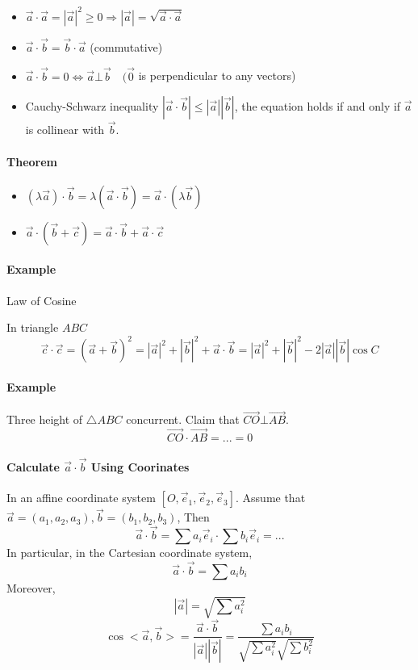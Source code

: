 \documentclass[UTF8]{ctexart}
\begin{document}
\begin{itemize}
  \item $\vec a \cdot \vec a  = |\vec a |^2 \geq 0 \Rightarrow |\vec a| = \sqrt{\vec a \cdot \vec a}$
  \item $\vec a \cdot \vec b  = \vec b \cdot \vec a$ (commutative)
  \item $\vec a \cdot \vec b = 0 \iff \vec a \bot \vec b \quad (\vec 0$ is perpendicular to any vectors)
  \item Cauchy-Schwarz inequality $|\vec a \cdot \vec b| \leq |\vec a|| \vec b|$, the equation holds if and only if $\vec a$ is collinear with $\vec b$.
\end{itemize}

\paragraph{Theorem}
\begin{itemize}
  \item $(\lambda \vec a) \cdot \vec b = \lambda (\vec a \cdot \vec b) = \vec a\cdot (\lambda \vec b)$
  \item $\vec a \cdot (\vec b + \vec c) = \vec a \cdot \vec b + \vec a \cdot \vec c$
\end{itemize}

\paragraph{Example} Law of Cosine

In triangle $ABC$
$$
\vec c \cdot \vec c = (\vec a + \vec b)^2 = |\vec a|^2+|\vec b|^2+\vec a \cdot \vec b = |\vec a|^2 + |\vec b|^2 - 2|\vec a||\vec b| \cos {C}
$$

\paragraph{Example} Three height of $\triangle ABC$ concurrent. Claim that $\overrightarrow{CO}\bot \overrightarrow{AB}$.
$$
\overrightarrow {CO} \cdot \overrightarrow{AB} = ... = 0
$$

\paragraph{Calculate $\vec a \cdot \vec b$ Using Coorinates}

In an affine coordinate system $[O,\vec e_1,\vec e_2,\vec e_3]$. Assume that $\vec a = (a_1,a_2,a_3), \vec b = (b_1,b_2,b_3)$, Then 
$$
\vec a \cdot \vec b = \sum a_i \vec e_i \cdot \sum b_i \vec e_i = ... 
$$
In particular, in the Cartesian coordinate system, 
$$
\vec a \cdot \vec b = \sum a_ib_i
$$
Moreover, 
$$
|\vec a| = \sqrt{\sum a_i^2}
$$
$$
\cos <\vec a, \vec b> = \frac{\vec a\cdot \vec b}{|\vec a||\vec b|}= \frac{\sum a_ib_i}{\sqrt{\sum a_i^2} \sqrt{\sum b_i^2}}
$$
\end{document}
